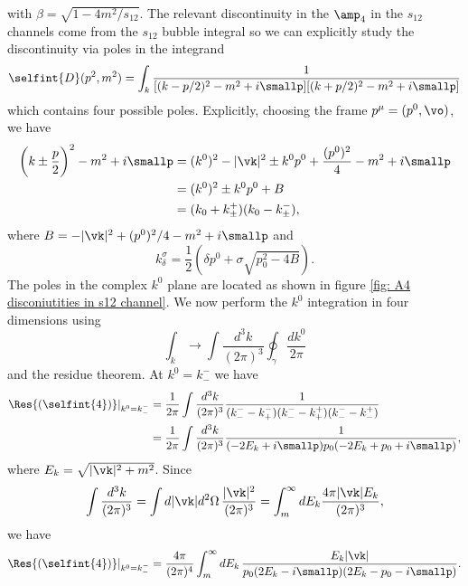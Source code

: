 with $\beta = \sqrt{1 - 4m^2/s_{12}}$. The relevant discontinuity in the $\amp_4$ in the $s_{12}$ channels come from the $s_{12}$ bubble integral so we can explicitly study the discontinuity via poles in the integrand
\begin{equation}
    \selfint{D}(p^2,m^2) = \int_k\frac{1}{[(k - p/2)^2 - m^2 + i\smallp][(k + p/2)^2 - m^2 + i\smallp]}
\end{equation}
which contains four possible poles. Explicitly, choosing the frame $p^\mu = (p^0,\vo)$, we have
\begin{equation}
    \begin{split}
        \bigg(k \pm \frac{p}{2}\bigg)^2 - m^2 + i\smallp &= (k^0)^2 - |\vk|^2 \pm k^0p^0 + \frac{(p^0)^2}{4} - m^2 + i\smallp \\
        &= (k^0)^2 \pm k^0p^0 + B \\
        &= (k_0 + k_\pm^+)(k_0 - k_\pm^-),
    \end{split}
\end{equation}
where $B = -|\vk|^2 + (p^0)^2/4  -m^2 + i\smallp$ and 
\begin{equation}
    k^\sigma_\delta = \frac{1}{2}(\delta p^0 + \sigma\sqrt{p_0^2 - 4B}).
\end{equation}
The poles in the complex $k^0$ plane are located as shown in figure \ref{fig: A4 disconiutities in s12 channel}. We now perform the $k^0$ integration in four dimensions using 
\begin{equation}
    \int_k \to \int\frac{d^3k}{(2\pi)^3}\oint_\gamma\frac{dk^0}{2\pi}
\end{equation}
and the residue theorem. At $k^0 = k_-^-$ we have
\begin{equation}
    \begin{split}
        \Res{(\selfint{4})}|_{k^0 = k_-^-} &= \frac{1}{2\pi}\int\frac{d^3k}{(2\pi)^3}\frac{1}{(k_-^- - k_+^-)(k_-^- - k_+^+)(k_-^- - k_-^+)} \\
        &= \frac{1}{2\pi}\int\frac{d^3k}{(2\pi)^3}\frac{1}{(-2E_k + i\smallp)p_0(-2E_k + p_0 + i\smallp)},
    \end{split}
\end{equation}
where $E_k = \sqrt{|\vk|^2 + m^2}$. Since 
\begin{equation}
    \int\frac{d^3k}{(2\pi)^3} = \int d|\vk|d^2\Omega\,\frac{|\vk|^2}{(2\pi)^3} = \int_m^\infty dE_k\frac{4\pi|\vk|E_k}{(2\pi)^3},
\end{equation}
we have
\begin{equation}
    \Res{(\selfint{4})}|_{k^0 = k_-^-} = \frac{4\pi}{(2\pi)^4}\int_m^\infty dE_k\,\frac{E_k|\vk|}{p_0(2E_k - i\smallp)(2E_k - p_0 - i\smallp)}.
\end{equation}
